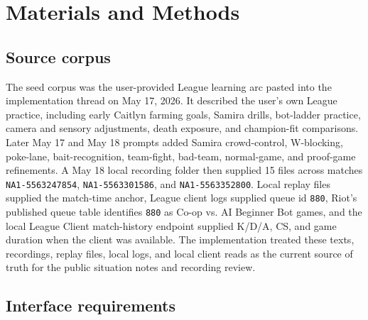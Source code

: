 \documentclass[12pt,letterpaper]{article}
\begin{document}
\section{Materials and Methods}

\subsection*{Source corpus}

The seed corpus was the user-provided League learning arc pasted into the implementation thread on May 17, 2026. It described the user's own League practice, including early Caitlyn farming goals, Samira drills, bot-ladder practice, camera and sensory adjustments, death exposure, and champion-fit comparisons. Later May 17 and May 18 prompts added Samira crowd-control, W-blocking, poke-lane, bait-recognition, team-fight, bad-team, normal-game, and proof-game refinements. A May 18 local recording folder then supplied 15 files across matches \texttt{NA1-5563247854}, \texttt{NA1-5563301586}, and \texttt{NA1-5563352800}. Local replay files supplied the match-time anchor, League client logs supplied queue id \texttt{880}, Riot's published queue table identifies \texttt{880} as Co-op vs. AI Beginner Bot games,\cite{riotqueues2026} and the local League Client match-history endpoint supplied K/D/A, CS, and game duration when the client was available. The implementation treated these texts, recordings, replay files, local logs, and local client reads as the current source of truth for the public situation notes and recording review.

\subsection*{Interface requirements}
\end{document}

